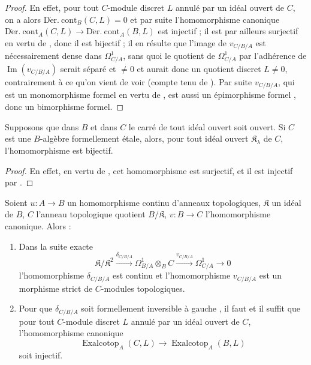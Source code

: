 \begin{proof}
En effet, pour tout $C$-module discret $L$ annulé par un idéal ouvert de $C$,
on a alors 
$\operatorname{D\acute{e}r.\ cont}_B(C,L)=0$ et par suite
 l'homomorphisme canonique
$\operatorname{D\acute{e}r.\ cont}_A(C,L)\to
\operatorname{D\acute{e}r.\ cont}_A(B,L)$ est injectif ; il est par ailleurs
surjectif en vertu de , donc il est bijectif ; il en résulte
que l'image de $v_{C/B/A}$ est nécessairement dense dans $\Omega^1_{C/A}$,
sans quoi le quotient de $\Omega^1_{C/A}$ par l'adhérence de
$\operatorname{Im}(v_{C/B/A})$ serait séparé et $\neq0$ et aurait donc un
quotient discret $L\neq0$, contrairement à ce qu'on vient de voir (compte tenu
de ). Par suite $v_{C/B/A}$, qui est un monomorphisme formel
en vertu de , est aussi un épimorphisme formel
, donc un bimorphisme formel.
\end{proof}

\begin{corollary}[20.7.7]
\label{0.20.7.7-fr}
Supposons que dans $B$ et dans $C$ le carré de tout idéal ouvert soit ouvert.
Si $C$ est une $B$-algèbre formellement étale, alors, pour tout idéal ouvert
$\mathfrak{K}_\lambda$ de $C$, l'homomorphisme \textup{} est
bijectif.
\end{corollary}

\begin{proof}
En effet, en vertu de , cet homomorphisme est surjectif, et
il est injectif par .
\end{proof}

\begin{proposition}[20.7.8]
\label{0.20.7.8-fr}
Soient $u:A\to B$ un homomorphisme continu d'anneaux topologiques,
$\mathfrak{K}$ un idéal de $B$, $C$ l'anneau topologique quotient
$B/\mathfrak{K}$, $v:B\to C$ l'homomorphisme canonique. Alors :
\begin{enumerate}
  \item[\rm(i)] Dans la suite exacte \textup{}
\[
  \mathfrak{K}/\mathfrak{K}^2\xrightarrow{\delta_{C/B/A}}
  \Omega^1_{B/A}\otimes_B C\xrightarrow{v_{C/B/A}}\Omega^1_{C/A}\to0
\]
l'homomorphisme $\delta_{C/B/A}$ est continu et l'homomorphisme $v_{C/B/A}$
est un morphisme strict de $C$-modules topologiques.
  \item[\rm(ii)] Pour que $\delta_{C/B/A}$ soit formellement inversible à
gauche \textup{}, il faut et il suffit que pour tout $C$-module
discret $L$ annulé par un idéal ouvert de $C$, l'homomorphisme canonique
\begin{equation}
\tag{20.7.8.1}
\label{0.20.7.8.1-fr}
  \operatorname{Exalcotop}_A(C,L)\to\operatorname{Exalcotop}_A(B,L)
\end{equation}
soit injectif.
\end{enumerate}
\end{proposition}

